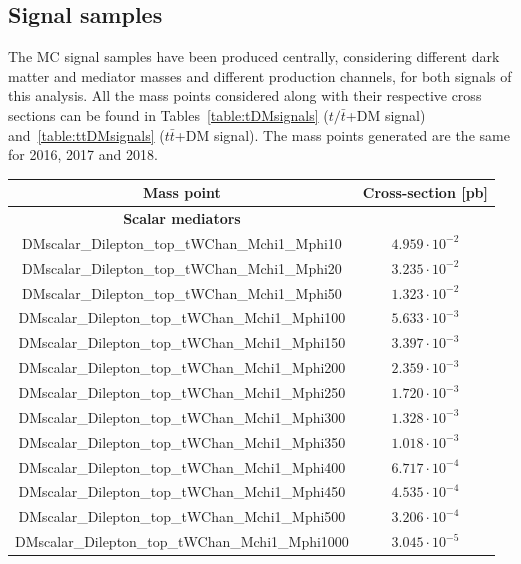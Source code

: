 \documentclass[a4paper, 10pt, openright]{report}
\begin{document}
\begin{appendices}
\section{Signal samples}  \label{appendix:SignalSamples}

The \ac{MC} signal samples have been produced centrally, considering different dark matter and mediator masses and different production channels, for both signals of this analysis. All the mass points considered along with their respective cross sections can be found in Tables~\ref{table:tDMsignals} ($t/ \bar t$+DM signal) and~\ref{table:ttDMsignals} ($t \bar t$+DM signal). The mass points generated are the same for 2016, 2017 and 2018.

\begin{table}
\begin{center}
\begin{tabular}{ c|c } 
 \hline
 Mass point & Cross-section [pb] \\
\hline
\textbf{Scalar mediators} & \\
 DMscalar\_Dilepton\_top\_tWChan\_Mchi1\_Mphi10 & $4.959 \cdot 10^{-2}$ \\
 DMscalar\_Dilepton\_top\_tWChan\_Mchi1\_Mphi20 & $3.235 \cdot 10^{-2}$ \\
 DMscalar\_Dilepton\_top\_tWChan\_Mchi1\_Mphi50 & $1.323 \cdot 10^{-2}$ \\
 DMscalar\_Dilepton\_top\_tWChan\_Mchi1\_Mphi100 & $5.633 \cdot 10^{-3}$ \\
 DMscalar\_Dilepton\_top\_tWChan\_Mchi1\_Mphi150 & $3.397 \cdot 10^{-3}$ \\
 DMscalar\_Dilepton\_top\_tWChan\_Mchi1\_Mphi200 & $2.359 \cdot 10^{-3}$ \\
 DMscalar\_Dilepton\_top\_tWChan\_Mchi1\_Mphi250 & $1.720 \cdot 10^{-3}$ \\
 DMscalar\_Dilepton\_top\_tWChan\_Mchi1\_Mphi300 & $1.328 \cdot 10^{-3}$ \\
 DMscalar\_Dilepton\_top\_tWChan\_Mchi1\_Mphi350 & $1.018 \cdot 10^{-3}$ \\
 DMscalar\_Dilepton\_top\_tWChan\_Mchi1\_Mphi400 & $6.717 \cdot 10^{-4}$ \\
 DMscalar\_Dilepton\_top\_tWChan\_Mchi1\_Mphi450 & $4.535 \cdot 10^{-4}$ \\
 DMscalar\_Dilepton\_top\_tWChan\_Mchi1\_Mphi500 & $3.206 \cdot 10^{-4}$ \\
 DMscalar\_Dilepton\_top\_tWChan\_Mchi1\_Mphi1000 & $3.045 \cdot 10^{-5}$ \\

\end{tabular}
\end{center}
\end{table}
\end{appendices}
\end{document}
